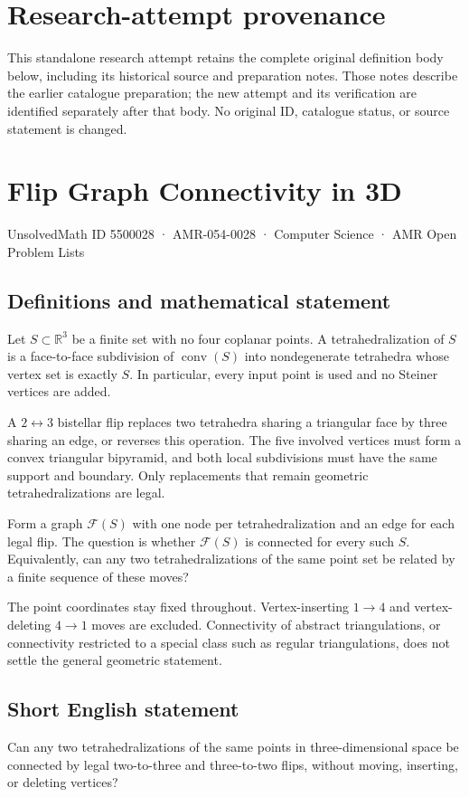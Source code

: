 \documentclass[11pt,a4paper]{article}
\begin{document}
\section*{Research-attempt provenance}
This standalone research attempt retains the complete original definition body below,
including its historical source and preparation notes. Those notes describe the
earlier catalogue preparation; the new attempt and its verification are identified
separately after that body. No original ID, catalogue status, or source statement is changed.

\section*{Flip Graph Connectivity in 3D}\label{5500028}
{\small UnsolvedMath ID 5500028 · AMR-054-0028 · Computer Science · AMR Open Problem Lists}
\subsection{Definitions and mathematical statement}
Let $S\subset\mathbb R^3$ be a finite set with no four coplanar points.
A tetrahedralization of $S$ is a face-to-face subdivision of
$\operatorname{conv}(S)$ into nondegenerate tetrahedra whose vertex set
is exactly $S$. In particular, every input point is used and no
Steiner vertices are added.

A $2\leftrightarrow3$ bistellar flip replaces two tetrahedra sharing
a triangular face by three sharing an edge, or reverses this operation.
The five involved vertices must form a convex triangular bipyramid,
and both local subdivisions must have the same support and boundary.
Only replacements that remain geometric tetrahedralizations are legal.

Form a graph $\mathcal F(S)$ with one node per tetrahedralization and
an edge for each legal flip. The question is whether $\mathcal F(S)$
is connected for every such $S$. Equivalently, can any two
tetrahedralizations of the same point set be related by a finite
sequence of these moves?

The point coordinates stay fixed throughout. Vertex-inserting
$1\to4$ and vertex-deleting $4\to1$ moves are excluded. Connectivity
of abstract triangulations, or connectivity restricted to a special
class such as regular triangulations, does not settle the general
geometric statement.
\subsection{Short English statement}
Can any two tetrahedralizations of the same points in three-dimensional
space be connected by legal two-to-three and three-to-two flips, without
moving, inserting, or deleting vertices?
\end{document}
